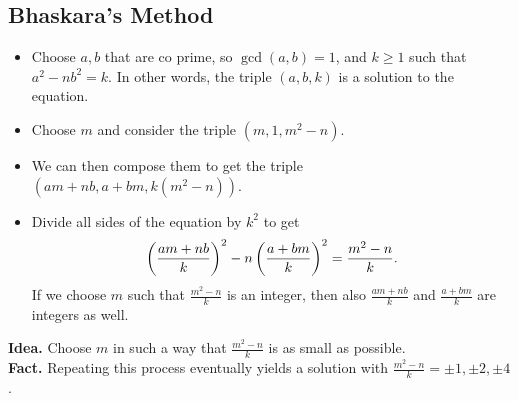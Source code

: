 \documentclass[class=article, crop=false]{standalone}
\begin{document}
  \subsection{Bhaskara's Method}
  \begin{itemize}
    \item Choose $a, b$ that are co prime, so $\gcd(a, b) = 1$, and $k \geq 1$ such that $a^2 - nb^2 = k$. In other words, the triple $(a, b, k)$ is a solution to the equation.
    \item Choose $m$ and consider the triple $(m, 1, m^2 - n)$.
    \item We can then compose them to get the triple $(am + nb, a + bm, k(m^2 - n))$.
    \item Divide all sides of the equation by $k^2$ to get
    \[
      \left( \frac{am + nb}{k} \right)^2 - n\left( \frac{a + bm}{k} \right)^2 = \frac{m^2 - n}{k}.
    \]
    If we choose $m$ such that $\frac{m^2 - n}{k}$ is an integer, then also $\frac{am + nb}{k}$ and $\frac{a + bm}{k}$ are integers as well.
  \end{itemize}
  \textbf{Idea.} Choose $m$ in such a way that $\frac{m^2 - n}{k}$ is as small as possible. \\
  \textbf{Fact.} Repeating this process eventually yields a solution with $\frac{m^2 - n}{k} = \pm 1, \pm 2, \pm 4$. 
\end{document}
